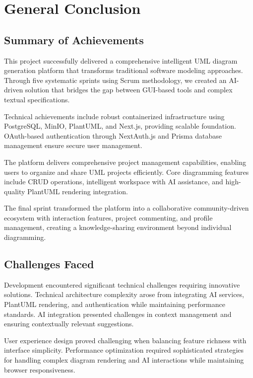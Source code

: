 \chapter{General Conclusion}

\section{Summary of Achievements}

This project successfully delivered a comprehensive intelligent UML diagram generation platform that transforms traditional software modeling approaches. Through five systematic sprints using Scrum methodology, we created an AI-driven solution that bridges the gap between GUI-based tools and complex textual specifications.

Technical achievements include robust containerized infrastructure using PostgreSQL, MinIO, PlantUML, and Next.js, providing scalable foundation. OAuth-based authentication through NextAuth.js and Prisma database management ensure secure user management.

The platform delivers comprehensive project management capabilities, enabling users to organize and share UML projects efficiently. Core diagramming features include CRUD operations, intelligent workspace with AI assistance, and high-quality PlantUML rendering integration.

The final sprint transformed the platform into a collaborative community-driven ecosystem with interaction features, project commenting, and profile management, creating a knowledge-sharing environment beyond individual diagramming.

\section{Challenges Faced}

Development encountered significant technical challenges requiring innovative solutions. Technical architecture complexity arose from integrating AI services, PlantUML rendering, and authentication while maintaining performance standards. AI integration presented challenges in context management and ensuring contextually relevant suggestions.

User experience design proved challenging when balancing feature richness with interface simplicity. Performance optimization required sophisticated strategies for handling complex diagram rendering and AI interactions while maintaining browser responsiveness.

